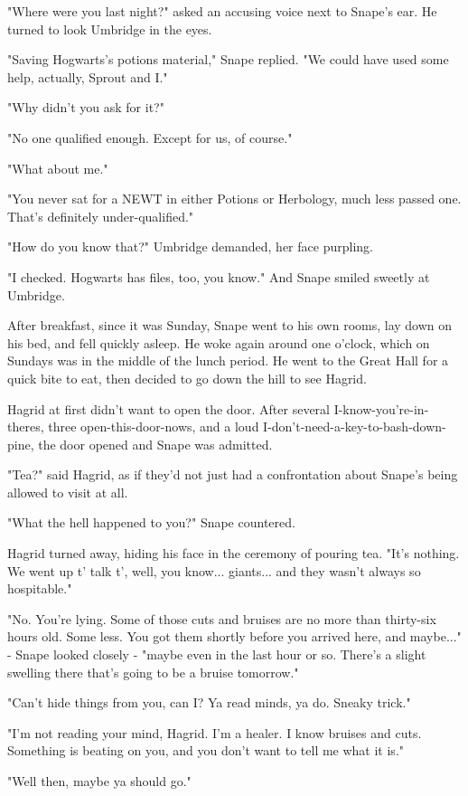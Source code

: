 "Where were you last night?" asked an accusing voice next to Snape's ear. He turned to look Umbridge in the eyes.

"Saving Hogwarts's potions material," Snape replied. "We could have used some help, actually, Sprout and I."

"Why didn't you ask for it?"

"No one qualified enough. Except for us, of course."

"What about me."

"You never sat for a NEWT in either Potions or Herbology, much less passed one. That's definitely under-qualified."

"How do you know that?" Umbridge demanded, her face purpling.

"I checked. Hogwarts has files, too, you know." And Snape smiled sweetly at Umbridge.

After breakfast, since it was Sunday, Snape went to his own rooms, lay down on his bed, and fell quickly asleep. He woke again around one o'clock, which on Sundays was in the middle of the lunch period. He went to the Great Hall for a quick bite to eat, then decided to go down the hill to see Hagrid.

Hagrid at first didn't want to open the door. After several I-know-you're-in-theres, three open-this-door-nows, and a loud I-don't-need-a-key-to-bash-down-pine, the door opened and Snape was admitted.

"Tea?" said Hagrid, as if they'd not just had a confrontation about Snape's being allowed to visit at all.

"What the hell happened to you?" Snape countered.

Hagrid turned away, hiding his face in the ceremony of pouring tea. "It's nothing. We went up t' talk t', well, you know... giants... and they wasn't always so hospitable."

"No. You're lying. Some of those cuts and bruises are no more than thirty-six hours old. Some less. You got them shortly before you arrived here, and maybe..." - Snape looked closely - "maybe even in the last hour or so. There's a slight swelling there that's going to be a bruise tomorrow."

"Can't hide things from you, can I? Ya read minds, ya do. Sneaky trick."

"I'm not reading your mind, Hagrid. I'm a healer. I know bruises and cuts. Something is beating on you, and you don't want to tell me what it is."

"Well then, maybe ya should go."


